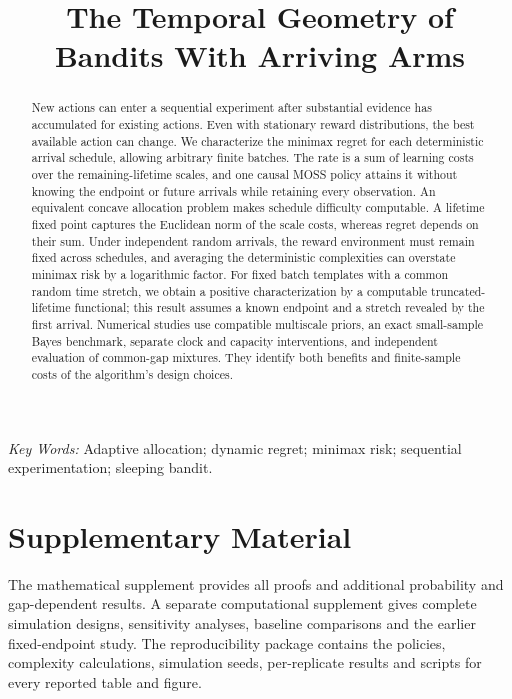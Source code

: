\documentclass[12pt,letterpaper,oneside]{article}
\title{The Temporal Geometry of Bandits With Arriving Arms}
\author{}
\date{}
\begin{document}
\begingroup
{}
\maketitle
\begin{abstract}
New actions can enter a sequential experiment after substantial evidence has accumulated for existing actions. Even with stationary reward distributions, the best available action can change. We characterize the minimax regret for each deterministic arrival schedule, allowing arbitrary finite batches. The rate is a sum of learning costs over the remaining-lifetime scales, and one causal MOSS policy attains it without knowing the endpoint or future arrivals while retaining every observation. An equivalent concave allocation problem makes schedule difficulty computable. A lifetime fixed point captures the Euclidean norm of the scale costs, whereas regret depends on their sum. Under independent random arrivals, the reward environment must remain fixed across schedules, and averaging the deterministic complexities can overstate minimax risk by a logarithmic factor. For fixed batch templates with a common random time stretch, we obtain a positive characterization by a computable truncated-lifetime functional; this result assumes a known endpoint and a stretch revealed by the first arrival. Numerical studies use compatible multiscale priors, an exact small-sample Bayes benchmark, separate clock and capacity interventions, and independent evaluation of common-gap mixtures. They identify both benefits and finite-sample costs of the algorithm's design choices.
\end{abstract}
\noindent\textit{Key Words:} Adaptive allocation; dynamic regret; minimax risk; sequential experimentation; sleeping bandit.
\vfill
\clearpage
\endgroup










\section*{Supplementary Material}
The mathematical supplement provides all proofs and additional probability and gap-dependent results. A separate computational supplement gives complete simulation designs, sensitivity analyses, baseline comparisons and the earlier fixed-endpoint study. The reproducibility package contains the policies, complexity calculations, simulation seeds, per-replicate results and scripts for every reported table and figure.
\end{document}
